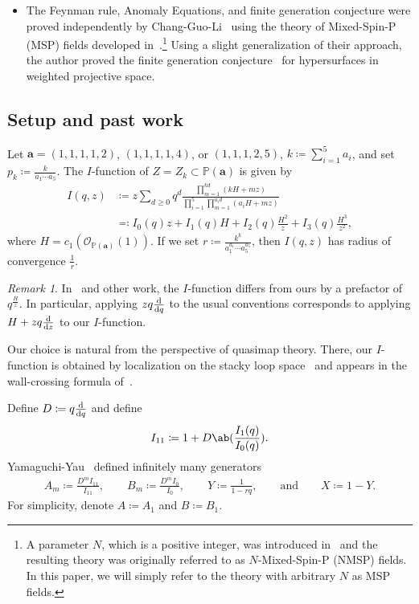 \documentclass[10pt]{amsart}
\theoremstyle{definition}
\theoremstyle{remark}
\newtheorem{rmk}[thm]{Remark}
\theoremstyle{plain}
\theoremstyle{definition}
\theoremstyle{remark}
\newcommand{\ba}{\mathbf{a}}
\renewcommand{\P}{\mathbb{P}}
\newcommand{\msc}[1]{\mathscr{#1}}
\newcommand{\1}{\mathbf{1}}
\newcommand{\2}{\mathbf{2}}
\newcommand{\3}{\mathbf{3}}
\numberwithin{equation}{section}
\begin{document}
\begin{itemize}
    \item The Feynman rule, Anomaly Equations, and finite generation conjecture were proved independently by Chang-Guo-Li~\cite{nmsp2,nmsp3} using the theory of Mixed-Spin-P (MSP) fields developed in~\cite{mspfermat,msp2,msp3,nmsp}.\footnote{A parameter $N$, which is a positive integer, was introduced in~\cite{nmsp} and the resulting theory was originally referred to as $N$-Mixed-Spin-P (NMSP) fields. In this paper, we will simply refer to the theory with arbitrary $N$ as MSP fields.} Using a slight generalization of their approach, the author proved the finite generation conjecture~\cite{polynomiality} for hypersurfaces in weighted projective space.
\end{itemize}

\subsection{Setup and past work}%
\label{sub:Setup and past work}

Let $\ba = (1,1,1,1,2)$, $(1,1,1,1,4)$, or $(1,1,1,2,5)$, $k \coloneqq \sum_{i=1}^5 a_i$, and set $p_k \coloneqq \frac{k}{a_1\cdots a_5}$. The $I$-function of $Z = Z_k \subset \P(\ba)$ is given by
\begin{align*}
    I(q,z) &\coloneqq z \sum_{d \geq 0} q^d \frac{\prod_{m=1}^{kd} (kH+mz)}{\prod_{i=1}^5 \prod_{m=1}^{a_i d} (a_i H + mz)} \\
    &\eqqcolon I_0(q) z + I_1(q) H + I_2(q) \frac{H^2}{z} + I_3(q) \frac{H^3}{z^2},
\end{align*}
where $H = c_1(\msc{O}_{\P(\ba)}(1))$. If we set $r \coloneqq \frac{k^k}{a_1^{a_1} \cdots a_5^{a_5}}$, then $I(q,z)$ has radius of convergence $\frac{1}{r}$.

\begin{rmk}
    In~\cite{eqgwinv} and other work, the $I$-function differs from ours by a prefactor of $q^{\frac{H}{z}}$. In particular, applying $zq\odv{}{q}$ to the usual conventions corresponds to applying $H+zq\odv{}{z}$ to our $I$-function.

    Our choice is natural from the perspective of quasimap theory. There, our $I$-function is obtained by localization on the stacky loop space~\cite[Proposition 4.9]{orbqmap} and appears in the wall-crossing formula of~\cite{qmapwc}.
\end{rmk}

Define $D \coloneqq q \odv{}{q}$ and define
\[ I_{11} \coloneqq 1 + D\ab(\frac{I_1(q)}{I_0(q)}). \]
Yamaguchi-Yau~\cite{yy04} defined infinitely many generators
\begin{align*}
    A_m \coloneqq \frac{D^m I_{11}}{I_{11}}, \qquad 
    B_m \coloneqq \frac{D^m I_{0}}{I_{0}}, \qquad 
    Y \coloneqq \frac{1}{1-rq}, \qquad \text{and} \qquad X \coloneqq 1-Y.
\end{align*}
For simplicity, denote $A \coloneqq A_1$ and $B \coloneqq B_1$.
\end{document}
